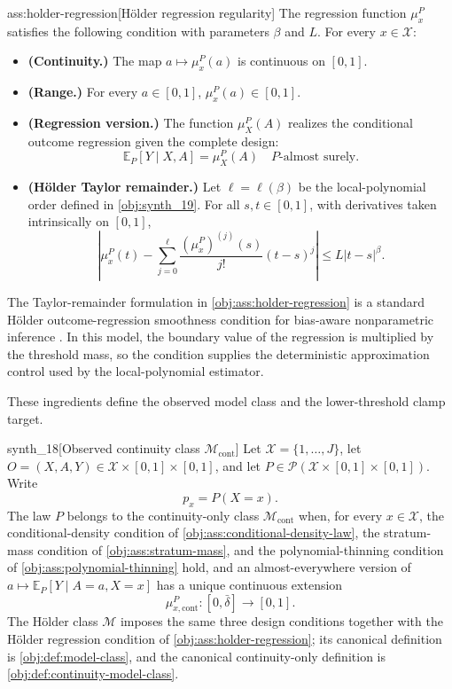 \begin{assumptionv}{ass:holder-regression}[Hölder regression regularity]
The regression function \(\mu_x^P\) satisfies the following condition with parameters \(\beta\) and \(L\). For every \(x\in\mathcal X\):
\begin{itemize}
\item \textbf{(Continuity.)} The map \(a\mapsto \mu_x^P(a)\) is continuous on \([0,1]\).
\item \textbf{(Range.)} For every \(a\in[0,1]\), \(\mu_x^P(a)\in[0,1]\).
\item \textbf{(Regression version.)} The function \(\mu_X^P(A)\) realizes the conditional outcome regression given the complete design:
\[
\mathbb E_P[Y\mid X,A]=\mu_X^P(A)
\quad P\text{-almost surely}.
\]
\item \textbf{(Hölder Taylor remainder.)} Let \(\ell=\ell(\beta)\) be the local-polynomial order defined in \cref{obj:synth_19}. For all \(s,t\in[0,1]\), with derivatives taken intrinsically on \([0,1]\),
\[
\left|
\mu_x^P(t)
-
\sum_{j=0}^{\ell}
\frac{(\mu_x^P)^{(j)}(s)}{j!}(t-s)^j
\right|
\le
L|t-s|^\beta .
\]
\end{itemize}
\end{assumptionv}

The Taylor-remainder formulation in \cref{obj:ass:holder-regression} is a standard Hölder outcome-regression smoothness condition for bias-aware nonparametric inference \citep{ArmstrongKolesar2020}. In this model, the boundary value of the regression  is multiplied by the threshold mass, so the condition supplies the deterministic approximation control used by the local-polynomial estimator.

These ingredients define the observed model class and the lower-threshold clamp target.

\begin{definitionv}{synth_18}[Observed continuity class $\mathcal M_{\mathrm{cont}}$]
Let \(\mathcal X=\{1,\ldots,J\}\), let \(O=(X,A,Y)\in\mathcal X\times[0,1]\times[0,1]\), and let \(P\in\mathcal P(\mathcal X\times[0,1]\times[0,1])\). Write
\[
p_x=P(X=x).
\]
The law \(P\) belongs to the continuity-only class \(\mathcal M_{\mathrm{cont}}\) when, for every \(x\in\mathcal X\), the conditional-density condition of \cref{obj:ass:conditional-density-law}, the stratum-mass condition of \cref{obj:ass:stratum-mass}, and the polynomial-thinning condition of \cref{obj:ass:polynomial-thinning} hold, and an almost-everywhere version of \(a\mapsto\mathbb E_P[Y\mid A=a,X=x]\) has a unique continuous extension
\[
\mu_{x,\mathrm{cont}}^P:[0,\bar\delta]\to[0,1].
\]
The Hölder class \(\mathcal M\) imposes the same three design conditions together with the Hölder regression condition of \cref{obj:ass:holder-regression}; its canonical definition is \cref{obj:def:model-class}, and the canonical continuity-only definition is \cref{obj:def:continuity-model-class}.
\end{definitionv}


